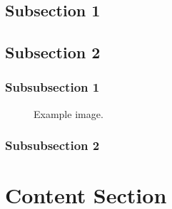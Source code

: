 \documentclass[12pt]{article} %
\begin{document}

\subsection{Subsection 1} %

\lipsum[1] %


\subsection{Subsection 2} %

\lipsum[2] %


\subsubsection{Subsubsection 1} %

\lipsum[3] %

\begin{figure}[H] %
\caption{Example image.}
\label{fig:speciation}
\end{figure}


\subsubsection{Subsubsection 2} %

\lipsum[4] %


\section{Content Section} %
\end{document}
